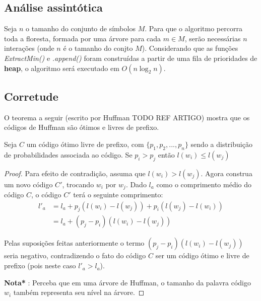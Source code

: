 \subsection{Análise assintótica}
Seja $n$ o tamanho do conjunto de símbolos $M$. 
Para que o algoritmo percorra toda a floresta, formada por uma árvore para cada $m \in M$, serão necessárias $n$ interações (onde $n$ é o tamanho do conjto $M$).
Considerando que as funções \emph{ExtractMin()} e \emph{.append()} foram construídas a partir de uma fila de prioridades de \textbf{heap}, o algoritmo será executado em  $O(n \log_2 n)$.

\subsection{Corretude}
O teorema a seguir (escrito por Huffman TODO REF ARTIGO) mostra  que os códigos de Huffman são ótimos e livres de prefixo.


\begin{lemma} \label{lemma:dist_prob_avg_size} Seja $C$ um código ótimo livre de prefixo, com $\{ p_1, p_2,..., p_n\}$ sendo a distribuição de probabilidades associada ao código. 
Se $p_i > p_j$ então $l(w_i) \leq l(w_j)$

\begin{proof} 
Para efeito de contradição, assuma que $l(w_i) > l(w_j)$. 
Agora construa um novo código $C'$, trocando $w_i$ por $w_j$. Dado $l_a$ como o comprimento médio do código $C$, o código $C'$ terá o seguinte comprimento:
\begin{align*}
l'_a &= l_a + p_j(l(w_i) - l(w_j)) + p_i(l(w_j) - l(w_i)) \\
&= l_a + (p_j - p_i)(l(w_i) - l(w_j)) 
\end{align*}

Pelas suposições feitas anteriormente o termo $(p_j - p_i)(l(w_i) - l(w_j))$ seria negativo, contradizendo o fato do código $C$ ser um código ótimo e livre de prefixo (pois neste caso $l'_a > l_a$).

\textbf{Nota*} : Perceba que em uma árvore de Huffman, o tamanho da palavra código $w_i$ também representa seu nível na árvore.
\end{proof}
\end{lemma}

